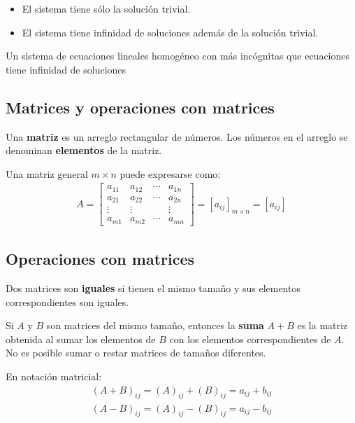 \documentclass[a4paper,12pt]{article}
\begin{document}
\begin{concept}
  \begin{itemize}
    \item El sistema tiene sólo la solución trivial.
    \item El sistema tiene infinidad de soluciones además de la solución
      trivial.
  \end{itemize}
\end{concept}

\begin{theorem}
  Un sistema de ecuaciones lineales homogéneo con más incógnitas que
  ecuaciones tiene infinidad de soluciones
  \label{theo:1}
\end{theorem}

\subsection{Matrices y operaciones con matrices}

\begin{concept}[i]
  Una \textbf{matriz} es un arreglo rectangular de números. Los números en el arreglo
  se denominan \textbf{elementos} de la matriz.
\end{concept}

Una matriz general $m\times n$ puede expresarse como:
\begin{align*}
  A = \begin{bmatrix}
    a_{11}& a_{12}& \cdots& a_{1n}\\
    a_{21}& a_{22}& \cdots& a_{2n}\\
    \vdots&\vdots &       &\vdots \\
    a_{m1}& a_{m2}& \cdots& a_{mn}
  \end{bmatrix}
  = \left[ a_{ij} \right]_{m\times n} = \left[ a_{ij} \right]
\end{align*}

\subsection{Operaciones con matrices}

\begin{concept}[i]
  Dos matrices son \textbf{iguales} si tienen el mismo tamaño y sus elementos
  correspondientes son iguales.
\end{concept}

\begin{concept}[i]
  Si $A$ y $B$ son matrices del mismo tamaño, entonces la \textbf{suma}
  $A+B$ es la matriz obtenida al sumar los elementos de $B$ con los elementos
  correspondientes de $A$. No es posible sumar o restar matrices de tamaños
  diferentes.
\end{concept}
En notación matricial:
  \begin{align*}
    (A+B)_{ij} = (A)_{ij} + (B)_{ij} = a_{ij} + b_{ij} \\
    (A-B)_{ij} = (A)_{ij} - (B)_{ij} = a_{ij} - b_{ij}
  \end{align*}
\end{document}
